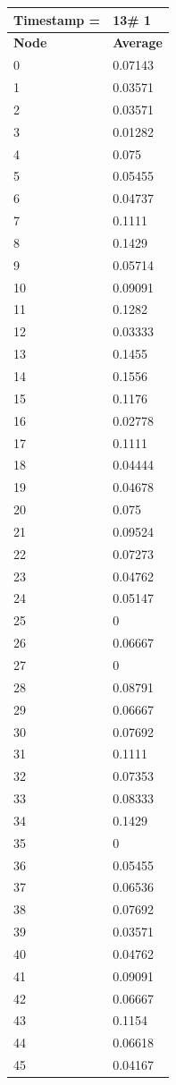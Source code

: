 \begin{tabular}{|l||l|}
\hline
\textbf{Timestamp =} & \textbf{13}\# 1\\\hline
	\textbf{Node} & \textbf{Average} \\ \hline
\hline
	0 & 0.07143 \\ \hline
	1 & 0.03571 \\ \hline
	2 & 0.03571 \\ \hline
	3 & 0.01282 \\ \hline
	4 & 0.075 \\ \hline
	5 & 0.05455 \\ \hline
	6 & 0.04737 \\ \hline
	7 & 0.1111 \\ \hline
	8 & 0.1429 \\ \hline
	9 & 0.05714 \\ \hline
	10 & 0.09091 \\ \hline
	11 & 0.1282 \\ \hline
	12 & 0.03333 \\ \hline
	13 & 0.1455 \\ \hline
	14 & 0.1556 \\ \hline
	15 & 0.1176 \\ \hline
	16 & 0.02778 \\ \hline
	17 & 0.1111 \\ \hline
	18 & 0.04444 \\ \hline
	19 & 0.04678 \\ \hline
	20 & 0.075 \\ \hline
	21 & 0.09524 \\ \hline
	22 & 0.07273 \\ \hline
	23 & 0.04762 \\ \hline
	24 & 0.05147 \\ \hline
	25 & 0 \\ \hline
	26 & 0.06667 \\ \hline
	27 & 0 \\ \hline
	28 & 0.08791 \\ \hline
	29 & 0.06667 \\ \hline
	30 & 0.07692 \\ \hline
	31 & 0.1111 \\ \hline
	32 & 0.07353 \\ \hline
	33 & 0.08333 \\ \hline
	34 & 0.1429 \\ \hline
	35 & 0 \\ \hline
	36 & 0.05455 \\ \hline
	37 & 0.06536 \\ \hline
	38 & 0.07692 \\ \hline
	39 & 0.03571 \\ \hline
	40 & 0.04762 \\ \hline
	41 & 0.09091 \\ \hline
	42 & 0.06667 \\ \hline
	43 & 0.1154 \\ \hline
	44 & 0.06618 \\ \hline
	45 & 0.04167 \\ \hline
\end{tabular}
